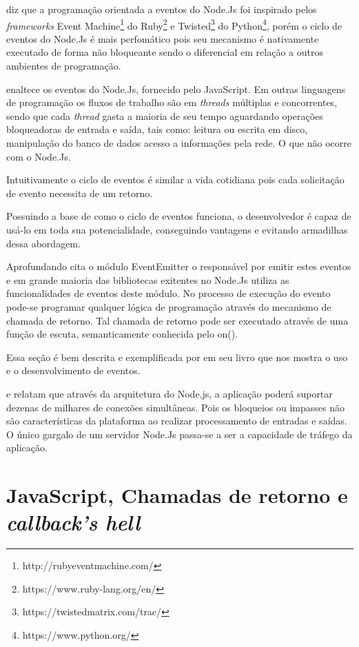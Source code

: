   \cite{Pereira:2013} diz que a programação orientada a eventos do Node.Js 
  foi inspirado pelos \textit{frameworks} Event Machine\footnote{http://rubyeventmachine.com/} do 
  Ruby\footnote{https://www.ruby-lang.org/en/} e Twisted\footnote{https://twistedmatrix.com/trac/} do 
  Python\footnote{https://www.python.org/}, porém o ciclo de eventos do Node.Js é mais perfomático pois seu mecanismo 
  é nativamente executado de forma não bloqueante sendo o diferencial em relação a outros ambientes de programação.
  
  \cite{Wilson:2013} enaltece os eventos do Node.Js, fornecido pelo JavaScript. Em outras linguagens de programação 
  os fluxos de trabalho são em \textit{threads} múltiplas e concorrentes, sendo que cada \textit{thread} gasta a maioria de seu tempo aguardando 
  operações bloqueadoras de entrada e saída, tais como: leitura ou escrita em disco, manipulação do banco de dados 
  acesso a informações pela rede. O que não ocorre com o Node.Js.
   
  Intuitivamente o ciclo de eventos é similar a vida cotidiana pois cada solicitação de evento necessita de um retorno.
  
  Possuindo a base de como o ciclo de eventos funciona, o desenvolvedor é capaz de usá-lo em toda sua potencialidade, 
  conseguindo vantagens e evitando armadilhas dessa abordagem.\cite{Hughes:2012}
  
  Aprofundando \cite{Pereira:2013} cita o módulo EventEmitter o responsável por emitir estes eventos e em 
  grande maioria das bibliotecas exitentes no Node.Js utiliza as funcionalidades de eventos deste módulo. 
  No processo de execução do evento pode-se programar qualquer lógica de programação através do 
  mecanismo de chamada de retorno. Tal chamada de retorno pode ser executado através de uma função de escuta, 
  semanticamente conhecida pelo on().
  
  Essa seção é bem descrita e exemplificada por \cite{Wilson:2013} em seu livro que nos mostra o uso e o 
  desenvolvimento de eventos.

   e  relatam que através da arquitetura do Node.js, a aplicação poderá 
  suportar dezenas de milhares de conexões simultâneas. Pois os bloqueios ou impasses não são características da plataforma ao
  realizar processamento de entradas e saídas. O único gargalo de um servidor Node.Js passa-se a ser a capacidade de 
  tráfego da aplicação.
  
\section{JavaScript, Chamadas de retorno e \textit{callback's hell}}
\label{chamadas-de-retorno-e-callback-hell}

